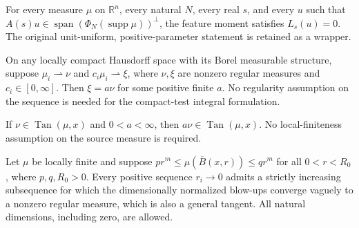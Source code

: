 \begin{lemma}
\label{lem:feature-moment-vanishing}

For every measure $\mu$ on $\mathbb R^n$, every natural $N$, every real $s$, and every $u$ such that $A(s)u\in\operatorname{span}(\Phi_N(\operatorname{supp}\mu))^\perp$, the feature moment satisfies $L_s(u)=0$. The original unit-uniform, positive-parameter statement is retained as a wrapper.
\end{lemma}

\begin{lemma}
\label{lem:vague-scalar-limits}

On any locally compact Hausdorff space with its Borel measurable structure, suppose $\mu_i\rightharpoonup\nu$ and $c_i\mu_i\rightharpoonup\xi$, where $\nu,\xi$ are nonzero regular measures and $c_i\in[0,\infty]$. Then $\xi=a\nu$ for some positive finite $a$. No regularity assumption on the sequence is needed for the compact-test integral formulation.
\end{lemma}

\begin{lemma}
\label{lem:general-tangent-scalar}

If $\nu\in\operatorname{Tan}(\mu,x)$ and $0<a<\infty$, then $a\nu\in\operatorname{Tan}(\mu,x)$. No local-finiteness assumption on the source measure is required.
\end{lemma}

\begin{lemma}
\label{lem:dimensional-extraction-ball-bounds}

Let $\mu$ be locally finite and suppose $p r^m\leq\mu(\overline B(x,r))\leq q r^m$ for all $0<r<R_0$, where $p,q,R_0>0$. Every positive sequence $r_i\to0$ admits a strictly increasing subsequence for which the dimensionally normalized blow-ups converge vaguely to a nonzero regular measure, which is also a general tangent. All natural dimensions, including zero, are allowed.
\end{lemma}

